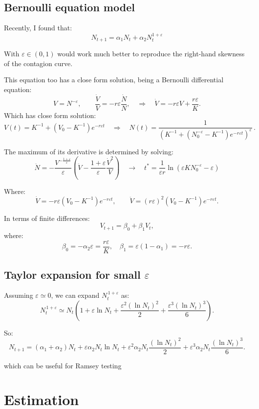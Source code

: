 \documentclass[12pt]{article}
\begin{document}
    \subsection{Bernoulli equation model}

    Recently, I found that:
    \begin{equation}
        N_{t+1} = \alpha_1 N_t + \alpha_2 N_{t}^{1 + \varepsilon}
        \label{eq:equation0}
    \end{equation}

    With $\varepsilon \in (0,1)$ would work much better to reproduce the right-hand skewness of the contagion curve.

    This equation too has a close form solution, being a Bernoulli differential equation:
    $$V = N^{-\varepsilon}, \qquad \frac{\dot V}{V} = -r \varepsilon \frac{\dot N}{N}, \quad \Rightarrow \quad \dot V = -r\varepsilon V + \frac{r\varepsilon}{K}. $$
    Which has close form solution:
    $$ V(t) = K^{-1} + \left(V_0-K^{-1}\right)e^{-r\varepsilon t} \quad \Rightarrow \quad N(t)=\frac{1}{\left(K^{-1} + \left(N_0^{-\varepsilon}-K^{-1}\right)e^{-r\varepsilon t}\right)^\varepsilon}\,.$$

    The maximum of its derivative is determined by solving:
    $$ \ddot N = -\frac{V^{-\frac{1+\varepsilon}{\varepsilon}}}{\varepsilon} \left(\ddot V -\frac{1+\varepsilon}{\varepsilon} \frac{\dot V ^2}{V}\right) \quad \to \quad t^* = \frac{1}{\varepsilon r}\ln \left(\varepsilon K N_0^{-\varepsilon}-\varepsilon\right) $$

    Where:
    $$ \dot V = -r\varepsilon\left(V_0-K^{-1}\right)e^{-r\varepsilon t}, \qquad \ddot V = (r\varepsilon)^2 \left(V_0-K^{-1}\right)e^{-r\varepsilon t}. $$

    In terms of finite differences:
    $$ V_{t+1} = \beta_0 + \beta_1 V_t,$$
    where:
    $$\beta_0 = -\alpha_2\varepsilon = \frac{r \varepsilon}{K}, \quad \beta_1=\varepsilon(1-\alpha_1) = - r\varepsilon.$$

    \subsection{Taylor expansion for small $\varepsilon$}
    Assuming $\varepsilon \simeq 0$, we can expand $N_{t}^{\,1+\varepsilon}$ as:
    \begin{equation}
        N_{t}^{\,1+\varepsilon} \simeq N_{t} \left( 1 + \varepsilon \ln N_{t} + \frac{\varepsilon^2 (\ln N_{t})^2}{2} + \frac{\varepsilon^3 (\ln N_{t})^3}{6} \right).
    \end{equation}

    So:
        \begin{equation}
        N_{t+1} = (\alpha_1 + \alpha_2) N_{t} + \varepsilon \alpha_2 N_{t}\ln N_{t} + \varepsilon^2 \alpha_2 N_{t} \frac{ (\ln N_{t})^2}{2} + \varepsilon^3 \alpha_2 N_{t} \frac{(\ln N_{t})^3}{6}.
        \end{equation}
    \newpage

    which can be useful for Ramsey testing

    \section{Estimation}\label{sec:estimation}
    
\end{document}

